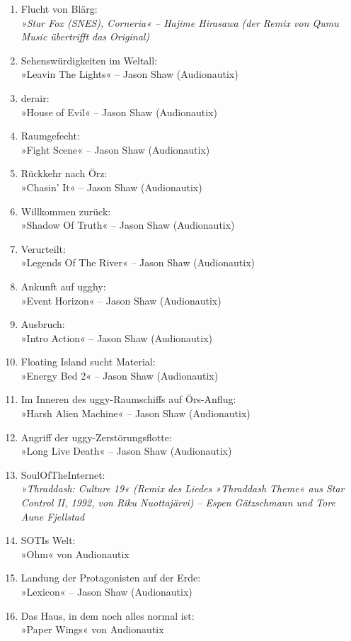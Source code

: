 \begin{enumerate}
    \item Flucht von Blärg:\\ \textit{»Star Fox (SNES), Corneria« – Hajime Hirasawa (der Remix von Qumu Music übertrifft das Original)}
    \item Sehenswürdigkeiten im Weltall:\\ »Leavin The Lights« – Jason Shaw (Audionautix)
    \item derair:\\ »House of Evil« – Jason Shaw (Audionautix)
    \item Raumgefecht:\\ »Fight Scene« – Jason Shaw (Audionautix)
    \item Rückkehr nach Örz:\\ »Chasin’ It« – Jason Shaw (Audionautix)
    \item Willkommen zurück:\\ »Shadow Of Truth« – Jason Shaw (Audionautix)
    \item Verurteilt:\\ »Legends Of The River« – Jason Shaw (Audionautix)
    \item Ankunft auf ugghy:\\ »Event Horizon« – Jason Shaw (Audionautix)
    \item Ausbruch:\\ »Intro Action« – Jason Shaw (Audionautix)
    \item Floating Island sucht Material:\\ »Energy Bed 2« – Jason Shaw (Audionautix)
    \item Im Inneren des uggy-Raumschiffs auf Örs-Anflug:\\ »Harsh Alien Machine« – Jason Shaw (Audionautix)
    \item Angriff der uggy-Zerstörungsflotte:\\ »Long Live Death« – Jason Shaw (Audionautix)
    \item SoulOfTheInternet:\\ \textit{»Thraddash: Culture 19« (Remix des Liedes »Thraddash Theme« aus Star Control II, 1992, von Riku Nuottajärvi) – Espen Gätzschmann und Tore Aune Fjellstad}
    \item SOTIs Welt:\\ »Ohm« von Audionautix
    \item Landung der Protagonisten auf der Erde:\\ »Lexicon« – Jason Shaw (Audionautix)
    \item Das Haus, in dem noch alles normal ist:\\ »Paper Wings« von Audionautix

\end{enumerate}
